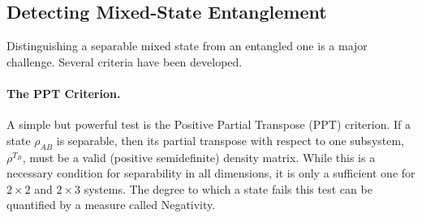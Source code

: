 \subsection{Detecting Mixed-State Entanglement}
\label{sub:detecting_entanglement}
Distinguishing a separable mixed state from an entangled one is a major
challenge. Several criteria have been developed.

\paragraph{The PPT Criterion.}
A simple but powerful test is the Positive Partial Transpose (PPT)
criterion. If a state $\rho_{AB}$ is separable, then its partial transpose
with respect to one subsystem, $\rho^{T_B}$, must be a valid (positive
semidefinite) density matrix. While this is a necessary condition for
separability in all dimensions, it is only a sufficient one for
$2 \times 2$ and $2 \times 3$ systems. The degree to which a state fails
this test can be quantified by a measure called Negativity.


